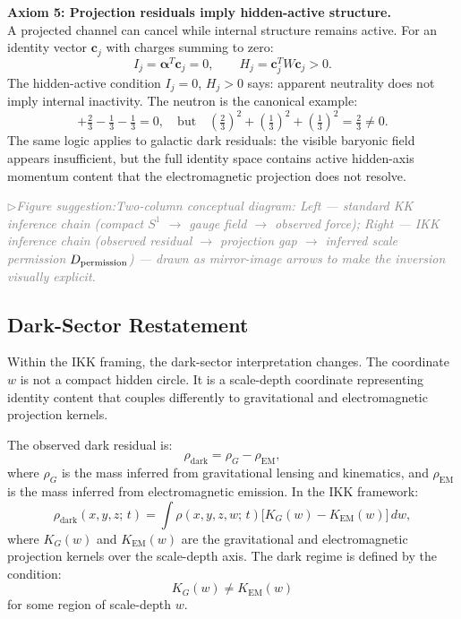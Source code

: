 \documentclass[11pt,a4paper]{article}
\newcommand{\figsuggest}[1]{%
  \medskip
  \noindent\hspace{0pt}\textcolor{gray}{\small\itshape
    $\triangleright$\;Figure suggestion:\enspace #1}%
  \medskip}
\begin{document}
\medskip
\noindent\textbf{Axiom 5: Projection residuals imply hidden-active structure.}\\
A projected channel can cancel while internal structure remains active.
For an identity vector $\mathbf{c}_j$ with charges summing to zero:
\[
  I_j = \boldsymbol{\alpha}^T \mathbf{c}_j = 0 ,
  \qquad
  H_j = \mathbf{c}_j^T W \mathbf{c}_j > 0 .
\]
The hidden-active condition $I_j = 0$, $H_j > 0$ says: apparent neutrality
does not imply internal inactivity.  The neutron is the canonical example:
\[
  +\tfrac{2}{3} - \tfrac{1}{3} - \tfrac{1}{3} = 0 ,
  \quad\text{but}\quad
  \left(\tfrac{2}{3}\right)^2 + \left(\tfrac{1}{3}\right)^2 + \left(\tfrac{1}{3}\right)^2
  = \tfrac{2}{3} \neq 0 .
\]
The same logic applies to galactic dark residuals: the visible baryonic
field appears insufficient, but the full identity space contains active
hidden-axis momentum content that the electromagnetic projection does not
resolve.

\figsuggest{Two-column conceptual diagram: \emph{Left} --- standard KK
inference chain (compact $S^1$ $\to$ gauge field $\to$ observed force);
\emph{Right} --- IKK inference chain (observed residual $\to$ projection
gap $\to$ inferred scale permission $D_{\rm permission}$) --- drawn as
mirror-image arrows to make the inversion visually explicit.}

\subsection{Dark-Sector Restatement}
\label{sec:darksector}

Within the IKK framing, the dark-sector interpretation changes.
The coordinate $w$ is not a compact hidden circle.  It is a scale-depth
coordinate representing identity content that couples differently to
gravitational and electromagnetic projection kernels.

The observed dark residual is:
\[
  \rho_{\text{dark}} = \rho_G - \rho_{\text{EM}} ,
\]
where $\rho_G$ is the mass inferred from gravitational lensing and kinematics,
and $\rho_{\text{EM}}$ is the mass inferred from electromagnetic emission.
In the IKK framework:
\[
  \rho_{\text{dark}}(x,y,z;\,t)
  = \int \rho(x,y,z,w;\,t)
    \bigl[K_G(w) - K_{\text{EM}}(w)\bigr]\,dw ,
\]
where $K_G(w)$ and $K_{\text{EM}}(w)$ are the gravitational and electromagnetic
projection kernels over the scale-depth axis.  The dark regime is defined by
the condition:
\[
  K_G(w) \neq K_{\text{EM}}(w)
\]
for some region of scale-depth $w$.
\end{document}
